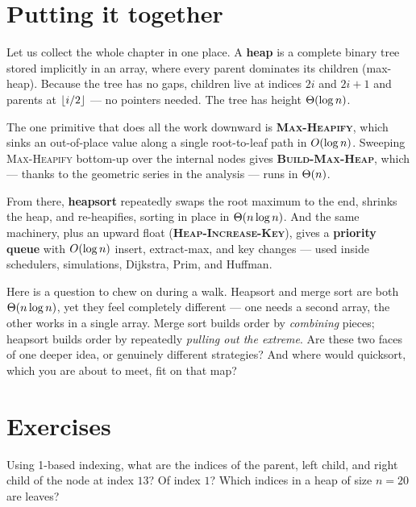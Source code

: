 \section{Putting it together}

\begin{recoverybox}
Let us collect the whole chapter in one place. A \textbf{heap} is a complete
binary tree stored implicitly in an array, where every parent dominates its
children (max-heap). Because the tree has no gaps, children live at indices $2i$
and $2i+1$ and parents at $\lfloor i/2\rfloor$ --- no pointers needed. The tree has
height $\Theta(\log n)$.

The one primitive that does all the work downward is \textbf{\textsc{Max-Heapify}},
which sinks an out-of-place value along a single root-to-leaf path in $O(\log
n)$. Sweeping \textsc{Max-Heapify} bottom-up over the internal nodes gives
\textbf{\textsc{Build-Max-Heap}}, which --- thanks to the geometric series in the
analysis --- runs in $\Theta(n)$.

From there, \textbf{heapsort} repeatedly swaps the root maximum to the end,
shrinks the heap, and re-heapifies, sorting in place in $\Theta(n\log n)$. And the
same machinery, plus an upward float (\textbf{\textsc{Heap-Increase-Key}}), gives
a \textbf{priority queue} with $O(\log n)$ insert, extract-max, and key
changes --- used inside schedulers, simulations, Dijkstra, Prim, and
Huffman.
\end{recoverybox}

\begin{walkbox}
Here is a question to chew on during a walk. Heapsort and merge sort are both
$\Theta(n\log n)$, yet they feel completely different --- one needs a second array,
the other works in a single array. Merge sort builds order by \emph{combining}
pieces; heapsort builds order by repeatedly \emph{pulling out the extreme}. Are
these two faces of one deeper idea, or genuinely different strategies? And where
would quicksort, which you are about to meet, fit on that map?
\end{walkbox}

\section{Exercises}

\begin{exercise}
Using 1-based indexing, what are the indices of the parent, left child, and right
child of the node at index $13$? Of index $1$? Which indices in a heap of size
$n=20$ are leaves?
\end{exercise}

